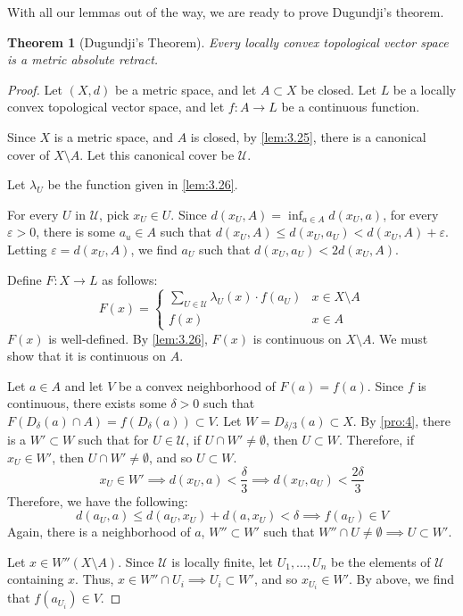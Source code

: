 \documentclass[openany, amssymb, psamsfonts]{amsart}
\let\fullref\autoref
\newtheorem{thm}{Theorem}[section]
\theoremstyle{definition}
\numberwithin{equation}{section}
\begin{document}
With all our lemmas out of the way, we are ready to prove Dugundji's theorem. 
\begin{thm}[Dugundji's Theorem]\label{thm:3.27}
  Every locally convex topological vector space is a metric absolute retract.
\end{thm}
\begin{proof}
  Let $(X,d)$ be a metric space, and let $A \subset X$ be closed. Let $L$ be a locally convex topological vector space, and let $f:A \to L$ be a continuous function. 

  Since $X$ is a metric space, and $A$ is closed, by \fullref{lem:3.25}, there is a canonical cover of $X\setminus A$. Let this canonical cover be $\mathcal{U}$.
  
  Let $\lambda_U$ be the function given in \fullref{lem:3.26}.

  For every $U$ in $\mathcal{U}$, pick $x_U \in U$. Since $d(x_U, A) = \inf_{a\in A} d(x_U, a)$, for every $\varepsilon>0$, there is some $a_u \in A$ such that $d(x_U, A) \le d(x_U, a_U) < d(x_U, A) + \varepsilon$. Letting $\varepsilon = d(x_U, A)$, we find $a_U$ such that $d(x_U, a_U) < 2 d(x_U, A)$. 

  Define $F: X \to L$ as follows:
  \[
    F(x) = \begin{cases}
      \displaystyle\sum_{U \in \mathcal{U}} \lambda_U(x) \cdot f(a_U) & x \in X\setminus A\\
      f(x) & x \in A
    \end{cases}
  \]
  $F(x)$ is well-defined. By \fullref{lem:3.26}, $F(x)$ is continuous on $X\setminus A$. We must show that it is continuous on $A$. 

  Let $a \in A$ and let $V$ be a convex neighborhood of $F(a) = f(a)$. Since $f$ is continuous, there exists some $\delta > 0$ such that $F(D_\delta(a)\cap A) = f(D_\delta(a)) \subset V$. Let $W = D_{\delta/3}(a) \subset X$. By \ref{pro:4}, there is a $W'\subset W$ such that for $U \in \mathcal{U}$, if $U\cap W' \neq \emptyset$, then $U \subset W$. Therefore, if $x_U \in W'$, then $U \cap W' \neq \emptyset$, and so $U \subset W$. 
  \[
    x_U \in W' \implies d(x_U, a) < \frac{\delta}3 \implies d(x_U, a_U) < \frac{2\delta}3
  \]
  Therefore, we have the following:
  \[
    d(a_U, a) \le d(a_U, x_U) + d(a, x_U) < \delta \implies f(a_U) \in V
  \]
  Again, there is a neighborhood of $a$, $W''\subset W'$ such that $W''\cap U \neq\emptyset \implies U \subset W'$. 

  Let $x \in W''(X\setminus A)$. Since $\mathcal{U}$ is locally finite, let $U_1, \ldots, U_n$ be the elements of $\mathcal{U}$ containing $x$. Thus, $x \in W'' \cap U_i \implies U_i \subset W'$, and so $x_{U_i} \in W'$. By above, we find that $f(a_{U_i}) \in V$. 


\end{proof}
\end{document}
